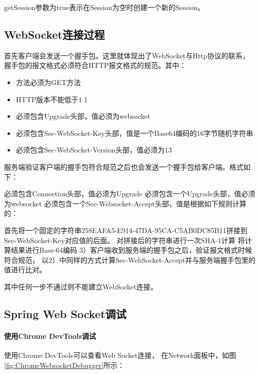 \documentclass{book}
\begin{document}
getSession参数为true表示在Session为空时创建一个新的Session。

\subsection{WebSocket连接过程}

首先客户端会发送一个握手包。这里就体现出了WebSocket与Http协议的联系，
握手包的报文格式必须符合HTTP报文格式的规范。其中：

\begin{itemize}
	\item{方法必须为GET方法}
	\item{HTTP版本不能低于1.1}
	\item{必须包含Upgrade头部，值必须为websocket}
	\item{必须包含Sec-WebSocket-Key头部，值是一个Base64编码的16字节随机字符串}
	\item{必须包含Sec-WebSocket-Version头部，值必须为13}
\end{itemize}

服务端验证客户端的握手包符合规范之后也会发送一个握手包给客户端。格式如下：

必须包含Connection头部，值必须为Upgrade
必须包含一个Upgrade头部，值必须为websocket
必须包含一个Sec-Websocket-Accept头部，值是根据如下规则计算的：

首先将一个固定的字符串258EAFA5-E914-47DA-95CA-C5AB0DC85B11拼接到Sec-WebSocket-Key对应值的后面。
对拼接后的字符串进行一次SHA-1计算
将计算结果进行Base-64编码
3）客户端收到服务端的握手包之后，验证报文格式时候符合规范，
以2）中同样的方式计算Sec-WebSocket-Accept并与服务端握手包里的值进行比对。

其中任何一步不通过则不能建立WebSocket连接。

\subsection{Spring Web Socket调试}

\paragraph{使用Chrome DevTools调试}使用Chrome DevTools可以查看Web Socket连接，
在Network面板中，如图\ref{fig:ChromeWebsocketDebugger}所示：
\end{document}
